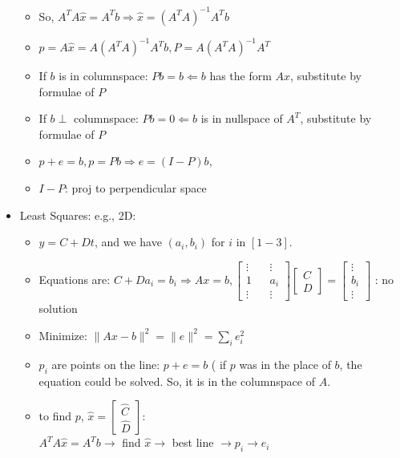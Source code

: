 \documentclass[a4paper,12pt]{article}
\begin{document}
\begin{itemize}
\begin{itemize}
			  \item So, $A^T A \hat{x} = A^T b \Longrightarrow \hat{x} = (A^T A)^{-1} A^T b$
			  
			  \item $p = A \hat{x} = A (A^T A)^{-1}A^T b, P = A (A^T A)^{-1} A^T$
			  
			  \item If $b$ is in columnspace: $Pb = b \Longleftarrow b$ has the form $Ax$, substitute by formulae of $P$
			  
			  \item If $b \perp$ columnspace: $Pb = 0 \Longleftarrow b$ is in nullspace of $A^T$, substitute by formulae of $P$
			  
			  \item $p+e = b, p = Pb \Rightarrow e = (I-P)b$,
			  
			  \item $I-P$: proj to perpendicular space
		\end{itemize}
		
		\item Least Squares: e.g., 2D:
		\begin{itemize}
			\item $y = C + Dt$, and we have $(a_i, b_i)$ for $i$ in $\left[1-3\right]$.
			\item Equations are: $C + D a_i = b_i \Longrightarrow Ax = b, 
			\begin{bmatrix}
			\vdots  && \vdots \\
			1          & & a_i    \\
			\vdots  && \vdots
			\end{bmatrix} \begin{bmatrix}
			C \\
			D
			\end{bmatrix} = \begin{bmatrix}
			\vdots \\
			b_i    \\
			\vdots
			\end{bmatrix}$ : no solution

			\item Minimize: $\lVert Ax - b \rVert ^2 = \lVert e \rVert ^2 = \sum_i e_i^2$
			
			\item $p_i$ are points on the line: $p + e = b$ ( if $p$ was in the place of $b$, the equation could be solved. So, it is in the columnspace of $A$.
			
			\item to find $p$, $\hat{x} = 
			\begin{bmatrix}
				\hat{C} \\
				\hat{D}
			\end{bmatrix}$:\\
			$A^T A \hat{x} = A^T b \rightarrow $ find $\hat{x} \rightarrow$  best line $\rightarrow p_i \rightarrow e_i$
			

\end{itemize}
\end{itemize}
\end{document}
